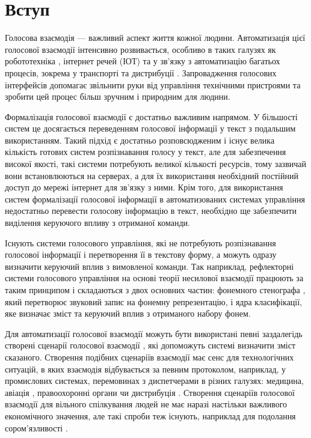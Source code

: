 \section{Вступ}

Голосова взаємодія --- важливий аспект життя кожної людини. Автоматизація цієї голосової взаємодії інтенсивно розвивається, особливо в таких галузях як робототехніка \cite{Ishiguro_2016}, інтернет речей (ІОТ) та у зв’язку з автоматизацію багатьох процесів, зокрема у транспорті \cite{Kravchenko_2009,Heisterkamp_2001} та дистрибуції  \cite{art2,conf9}. Запровадження голосових інтерфейсів допомагає звільнити руки від управління технічними пристроями та зробити цей процес більш зручним і природним для людини.

Формалізація голосової взаємодії є достатньо важливим напрямом. У більшості систем це досягається переведенням голосової інформації у текст з подальшим використанням. Такий підхід є достатньо розповсюдженим і існує велика кількість готових систем розпізнавання голосу у текст, але для забезпечення високої якості, такі системи потребують великої кількості ресурсів, тому зазвичай вони встановлюються на серверах, а для їх використання необхідний постійний доступ до мережі інтернет для зв’язку з ними. Крім того, для використання систем формалізації голосової інформації в автоматизованих системах управління недостатньо перевести голосову інформацію в текст, необхідно ще забезпечити виділення керуючого впливу з отриманої команди.

Існують системи голосового управління, які не потребують розпізнавання голосової інформації і перетворення її в текстову форму, а можуть одразу визначити керуючий вплив з вимовленої команди. Так наприклад, рефлекторні системи голосового управління \cite{Egorchenkov_2016,Teslia_2014,Teslia_2013} на основі теорії несилової взаємодії \cite{Teslia_2010} працюють за таким принципом і складаються з двох основних частин: фонемного стенографа \cite{Pylypenko_2008}, який перетворює звуковий запис на фонемну репрезентацію, і ядра класифікації, яке визначає зміст та керуючий вплив з отриманого набору фонем.

Для автоматизації голосової взаємодії можуть бути використані певні заздалегідь створені сценарії голосової взаємодії \cite{art3}, які допоможуть системі визначити зміст сказаного. Створення подібних сценаріїв взаємодії має сенс для технологічних ситуацій, в яких взаємодія відбувається за певним протоколом, наприклад, у промислових системах, перемовинах з диспетчерами в різних галузях: медицина, авіація \cite{Korsun_2013}, правоохоронні органи чи дистрибуція \cite{art3}. Створення сценаріїв голосової взаємодії для вільного спілкування людей не має наразі настільки важливого економічного значення, але такі спроби теж існують, наприклад для подолання сором’язливості \cite{Ishiguro_2016}.

